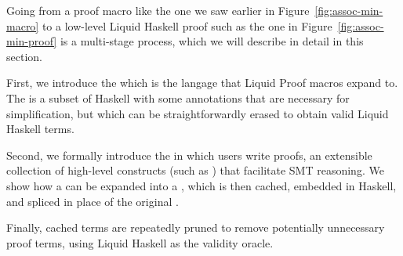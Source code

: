 % 
% 
  

Going from a proof macro like the one we saw earlier in
Figure~\ref{fig:assoc-min-macro} to a low-level Liquid Haskell proof
such as the one in Figure~\ref{fig:assoc-min-proof} is a
multi-stage process, which we will describe in detail in this section.

First, we introduce the \LangB which is the langage that Liquid
Proof macros expand to. The \LangB is a subset of Haskell with some
annotations that are necessary for simplification, but which can be
straightforwardly erased to obtain valid Liquid Haskell terms.

Second, we formally introduce the \LangA in which users write proofs,
an extensible collection of high-level constructs (such as
) that facilitate SMT reasoning. We show how a \LangATerm
can be expanded into a \LangBTerm, which is then cached, embedded in
Haskell, and spliced in place of the original \LangATerm.

Finally, cached terms are repeatedly pruned to remove potentially
unnecessary proof terms, using Liquid Haskell as the validity oracle.




